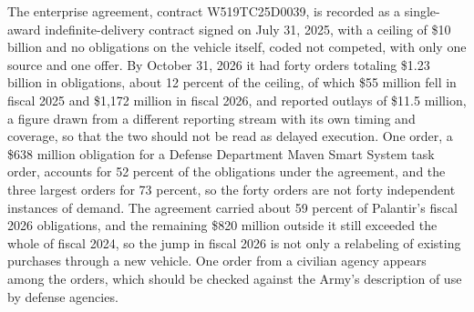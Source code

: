 \documentclass[12pt]{article}
\theoremstyle{remark}
\begin{document}
The enterprise agreement, contract W519TC25D0039, is recorded as a single-award indefinite-delivery contract signed on July 31, 2025, with a ceiling of \$10 billion and no obligations on the vehicle itself, coded not competed, with only one source and one offer. By October 31, 2026 it had forty orders totaling \$1.23 billion in obligations, about 12 percent of the ceiling, of which \$55 million fell in fiscal 2025 and \$1,172 million in fiscal 2026, and reported outlays of \$11.5 million, a figure drawn from a different reporting stream with its own timing and coverage, so that the two should not be read as delayed execution. One order, a \$638 million obligation for a Defense Department Maven Smart System task order, accounts for 52 percent of the obligations under the agreement, and the three largest orders for 73 percent, so the forty orders are not forty independent instances of demand. The agreement carried about 59 percent of Palantir's fiscal 2026 obligations, and the remaining \$820 million outside it still exceeded the whole of fiscal 2024, so the jump in fiscal 2026 is not only a relabeling of existing purchases through a new vehicle. One order from a civilian agency appears among the orders, which should be checked against the Army's description of use by defense agencies.
\end{document}

